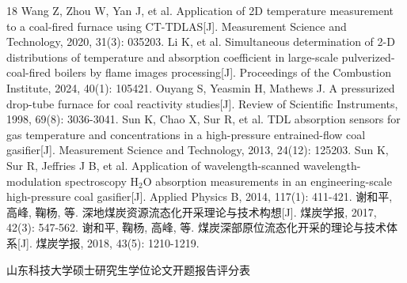 \documentclass[12pt,a4paper]{article}
\begin{document}
\begin{thebibliography}{18}
 Wang Z, Zhou W, Yan J, et al. Application of 2D temperature measurement to a coal-fired furnace using CT-TDLAS[J]. Measurement Science and Technology, 2020, 31(3): 035203.
 Li K, et al. Simultaneous determination of 2-D distributions of temperature and absorption coefficient in large-scale pulverized-coal-fired boilers by flame images processing[J]. Proceedings of the Combustion Institute, 2024, 40(1): 105421.
 Ouyang S, Yeasmin H, Mathews J. A pressurized drop-tube furnace for coal reactivity studies[J]. Review of Scientific Instruments, 1998, 69(8): 3036-3041.
 Sun K, Chao X, Sur R, et al. TDL absorption sensors for gas temperature and concentrations in a high-pressure entrained-flow coal gasifier[J]. Measurement Science and Technology, 2013, 24(12): 125203.
 Sun K, Sur R, Jeffries J B, et al. Application of wavelength-scanned wavelength-modulation spectroscopy H$_2$O absorption measurements in an engineering-scale high-pressure coal gasifier[J]. Applied Physics B, 2014, 117(1): 411-421.
 谢和平, 高峰, 鞠杨, 等. 深地煤炭资源流态化开采理论与技术构想[J]. 煤炭学报, 2017, 42(3): 547-562.
 谢和平, 鞠杨, 高峰, 等. 煤炭深部原位流态化开采的理论与技术体系[J]. 煤炭学报, 2018, 43(5): 1210-1219.
\end{thebibliography}

\clearpage

\thispagestyle{empty}
\begin{center}
  {\heiti\large 山东科技大学硕士研究生学位论文开题报告评分表}
\end{center}
\end{document}
